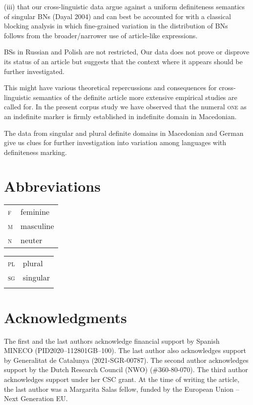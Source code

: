 \documentclass[output=paper,colorlinks,citecolor=brown]{langscibook}
\begin{document}
(iii) that our cross-linguistic data argue against a uniform definiteness semantics of singular BNs (Dayal 2004) and can best be accounted for with a classical blocking analysis in which fine-grained variation in the distribution of BNs follows from the broader/narrower use of article-like expressions.

BSs in Russian and Polish are not restricted,  
Our data does not prove or disprove its status of an article but suggests that the context where it appears should be further investigated. 

This might have various theoretical repercussions and consequences for cross-linguistic semantics of the definite article 
more extensive empirical studies are called for. 
In the present corpus study we have observed that the numeral \textsc{one} as an indefinite marker is firmly established in indefinite domain in Macedonian. 

The data from singular and plural definite domains in Macedonian and German give us clues for further investigation into variation among languages with definiteness marking.
\fi

\section*{Abbreviations}

\begin{tabularx}{.5\textwidth}{@{}lQ}

\textsc{f}&feminine\\
\textsc{m}&masculine\\
\textsc{n}&neuter\\
\end{tabularx}%
\begin{tabularx}{.5\textwidth}{lQ@{}}
\textsc{pl}&plural\\
\textsc{sg}&singular\\
&\\ %
\end{tabularx}



\section*{Acknowledgments}
The first and the last authors acknowledge financial
support by Spanish MINECO
(PID2020–112801GB–100). The last author also acknowledges support by Gene\-ra\-litat de Catalunya (2021-SGR-00787). The second author acknowledges
support by the Dutch Research Council (NWO) (\#360-80-070). The third author acknow\-ledges support under her CSC grant. At the time of writing the article, the last author was a Margarita Salas fellow, funded by the European Union -- Next Generation EU. 

\printbibliography[heading=subbibliography,notkeyword=this]
\end{document}
